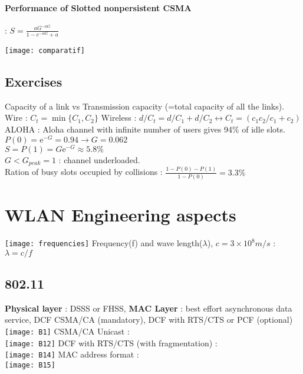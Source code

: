 \documentclass[6pt]{scrartcl}
\begin{document}
\begin{multicols}{4}
\paragraph{Performance of Slotted nonpersistent CSMA}:
$S = \frac{aG^{-aG}}{1-e^{-aG} + a}$

\texttt{[image: comparatif]}

\subsection{Exercises}
Capacity of a link vs Transmission capacity (=total capacity of all the links). Wire : $C_t=\min \{C_1, C_2\}$ Wireless : $d/C_t = d/C_1+d/C_2 \leftrightarrow C_t = (c_1 c_2/c_1+c_2)$\\
ALOHA : Aloha channel with infinite number of users gives 94\% of idle slots. $P(0) = \mathrm{e}^{-G}=0.94 \rightarrow G=0.062$ \\ $S=P(1)=G\mathrm{e}^{-G}\approx 5.8\%$ \\ $G<G_{peak} = 1$ : channel underloaded. \\ Ration of busy slots occupied by collisions : $\frac{1-P(0)-P(1)}{1-P(0)}=3.3\%$

\section{WLAN Engineering aspects}
\texttt{[image: frequencies]}
Frequency(f) and wave length($\lambda$), $c=3 \times 10^8 m/s$  : $\lambda = c/f$
\subsection{802.11}
\textbf{Physical layer} : DSSS or FHSS,
\textbf{MAC Layer} : best effort asynchronous data service, DCF CSMA/CA (mandatory), DCF with RTS/CTS or PCF (optional)
\texttt{[image: B1]}
CSMA/CA Unicast : \\
\texttt{[image: B12]}
DCF with RTS/CTS (with fragmentation) : \\
\texttt{[image: B14]}
MAC address format : \\
\texttt{[image: B15]}

\end{multicols}
\end{document}
